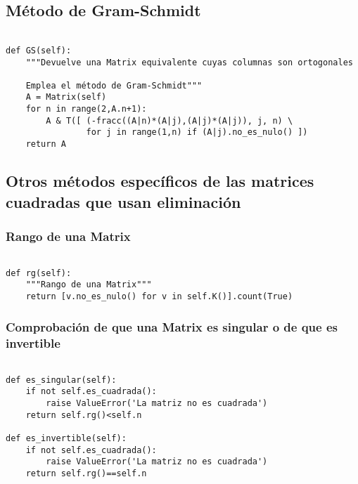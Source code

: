 \documentclass[11pt]{report}
\begin{document}
\subsection{Método de Gram-Schmidt}
\label{sec:org7b8d95d}

\begin{verbatim}

def GS(self):
    """Devuelve una Matrix equivalente cuyas columnas son ortogonales

    Emplea el método de Gram-Schmidt"""
    A = Matrix(self)
    for n in range(2,A.n+1):
        A & T([ (-fracc((A|n)*(A|j),(A|j)*(A|j)), j, n) \
                for j in range(1,n) if (A|j).no_es_nulo() ])
    return A

\end{verbatim}

\subsection{Otros métodos específicos de las matrices cuadradas que usan eliminación}
\label{sec:org3d751f9}
\subsubsection{Rango de una Matrix}
\label{sec:org99d9220}

\begin{verbatim}

def rg(self):
    """Rango de una Matrix"""
    return [v.no_es_nulo() for v in self.K()].count(True)

\end{verbatim}

\subsubsection{Comprobación de que una Matrix es singular o de que es invertible}
\label{sec:orgf301d41}

\begin{verbatim}

def es_singular(self):
    if not self.es_cuadrada():
        raise ValueError('La matriz no es cuadrada')
    return self.rg()<self.n
  
def es_invertible(self):
    if not self.es_cuadrada():
        raise ValueError('La matriz no es cuadrada')
    return self.rg()==self.n
  
\end{verbatim}
\end{document}
